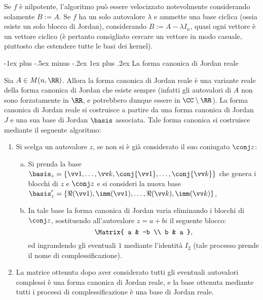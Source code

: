 \documentclass[10pt,landscape]{article}
\makeatletter
\renewcommand{\subsubsection}{\@startsection{subsubsection}{3}{0mm}%
	{-1ex plus -.5ex minus -.2ex}%
	{1ex plus .2ex}%
	{\normalfont\small\bfseries}}
\makeatother
\begin{document}
\begin{multicols}{3}
		Se $f$ è nilpotente, l'algoritmo può essere velocizzato notevolmente considerando
		solamente $B := A$. Se $f$ ha un solo autovalore $\lambda$ e ammette una base ciclica (ossia esiste un solo blocco di Jordan), considerando $B := A - \lambda I_n$,
		quasi ogni vettore è un vettore ciclico (è pertanto consigliato cercare un vettore
		in modo casuale, piuttosto che estendere tutte le basi dei kernel).
		
		\subsubsection{La forma canonica di Jordan reale}

		Sia $A \in M(n, \RR)$. Allora
		la forma canonica di Jordan reale è una variante reale della forma canonica di
		Jordan che esiste sempre (infatti gli autovalori di $A$ non sono forzatamente
		in $\RR$, e potrebbero dunque essere in $\CC \setminus \RR$). La forma canonica di
		Jordan reale si costruisce a partire da una forma canonica di Jordan $J$
		e una sua base di Jordan $\basis$ associata. Tale forma canonica
		si costruisce mediante il seguente algoritmo:
		
		\begin{enumerate}
			\item Si scelga un autovalore $z$, se non si è già considerato il
			suo coniugato $\conj z$:
			\begin{enumerate}[a.]
				\item Si prenda la base $\basis_z = \{\vv 1, \ldots, \vv k, \conj{\vv 1}, \ldots, \conj{\vv k}\}$ che
				genera i blocchi di $z$ e $\conj z$ e si consideri la nuova
				base $\basis_z' = \{ \Re(\vv 1), \imm(\vv 1), \ldots, \Re(\vv k), \imm(\vv k) \}$,
				\item In tale base la forma canonica di Jordan varia eliminando i blocchi
				di $\conj z$, sostituendo all'autovalore $z = a + bi$ il seguente blocco:
				\[ \Matrix{
					a & -b \\ b & a
				}, \]
				ed ingrandendo gli eventuali $1$ mediante l'identità $I_2$ (tale processo prende
				il nome di complessificazione).
			\end{enumerate}
			\item La matrice ottenuta dopo aver considerato tutti gli eventuali autovalori complessi è una forma canonica di Jordan reale, e la base ottenuta mediante
			tutti i processi di complessificazione è una base di Jordan reale.
		\end{enumerate}


\end{multicols}
\end{document}
